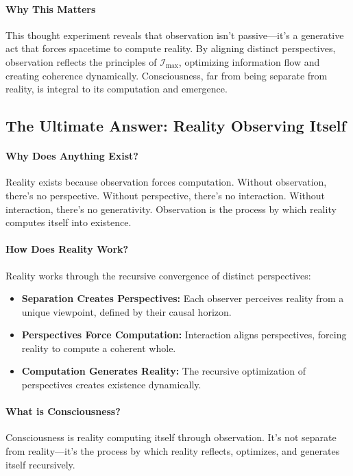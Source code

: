 \documentclass[12pt]{article}
\begin{document}
\paragraph{Why This Matters}
This thought experiment reveals that observation isn’t passive—it’s a generative act that forces spacetime to compute reality. By aligning distinct perspectives, observation reflects the principles of \(\mathcal{I}_{\text{max}}\), optimizing information flow and creating coherence dynamically. Consciousness, far from being separate from reality, is integral to its computation and emergence.


\subsection{The Ultimate Answer: Reality Observing Itself}

\paragraph{Why Does Anything Exist?}
Reality exists because observation forces computation. Without observation, there’s no perspective. Without perspective, there’s no interaction. Without interaction, there’s no generativity. Observation is the process by which reality computes itself into existence.

\paragraph{How Does Reality Work?}
Reality works through the recursive convergence of distinct perspectives:
\begin{itemize}
    \item \textbf{Separation Creates Perspectives:}  
    Each observer perceives reality from a unique viewpoint, defined by their causal horizon.
    \item \textbf{Perspectives Force Computation:}  
    Interaction aligns perspectives, forcing reality to compute a coherent whole.
    \item \textbf{Computation Generates Reality:}  
    The recursive optimization of perspectives creates existence dynamically.
\end{itemize}

\paragraph{What is Consciousness?}
Consciousness is reality computing itself through observation. It’s not separate from reality—it’s the process by which reality reflects, optimizes, and generates itself recursively.
\end{document}
